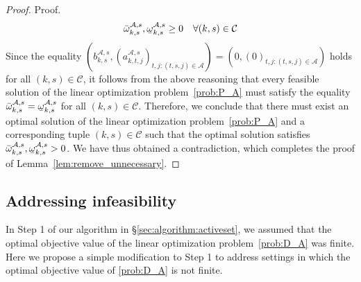 \documentclass[nonblindrev,mnsc]{informs3} %
\newcommand{\bx}{{\bf x}}
\newcommand{\by}{{\bf y}}
\newcommand{\ubar}[1]{\text{\b{$#1$}}}
\begin{document}
\begin{APPENDICES}
\begin{proof}{Proof.}
\begin{align*}
\begin{aligned}
    &&&  \bar{\omega}^{\mathcal{A},s}_{k,s} , \ubar{\omega}^{\mathcal{A},s}_{k,s}  \ge 0 &&  \forall (k,s) \in \mathcal{C}
    \end{aligned}
\end{align*}
Since the equality $ ({b}^{\mathcal{A},s}_{ k,s}, ( a^{\mathcal{A},s}_{k,t,j} )_{t,j: (t,s,j) \in \mathcal{A}}) = (0,(0)_{t,j: (t,s,j) \in \mathcal{A}} )$ holds for all $(k,s) \in \mathcal{C}$, it follows from the above reasoning that every feasible solution of the linear optimization problem~\eqref{prob:P_A} must satisfy the equality $\bar{\omega}^{\mathcal{A},s}_{k,s} = \ubar{\omega}^{\mathcal{A},s}_{k,s} $ for all $(k,s) \in \mathcal{C}$. Therefore, we conclude that there must exist an optimal solution of the linear optimization problem~\eqref{prob:P_A} and a corresponding tuple $(k,s) \in \mathcal{C}$ such that the optimal solution  satisfies $\bar{\omega}^{\mathcal{A},s}_{k,s}, \ubar{\omega}^{\mathcal{A},s}_{k,s} > 0$. We have thus obtained a contradiction, which completes the proof of Lemma~\ref{lem:remove_unnecessary}. 
\halmos \end{proof}




\subsection{Addressing infeasibility }  \label{sec:algorithm:infeas}
In Step 1 of our algorithm in  \S\ref{sec:algorithm:activeset}, we assumed that the optimal objective value of the linear optimization problem~\eqref{prob:D_A} was finite. Here we propose a simple modification to Step 1 to address settings in which the optimal objective value of \eqref{prob:D_A} is not finite.


\end{APPENDICES}
\end{document}
